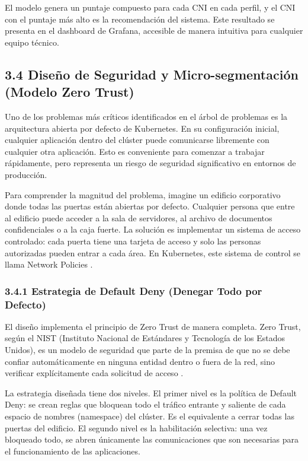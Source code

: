 \documentclass[journal]{IEEEtran}
\begin{document}
El modelo genera un puntaje compuesto para cada CNI en cada perfil, y el CNI con el puntaje más alto es la recomendación del sistema. Este resultado se presenta en el dashboard de Grafana, accesible de manera intuitiva para cualquier equipo técnico.

\subsection{3.4 Diseño de Seguridad y Micro-segmentación (Modelo Zero Trust)}

Uno de los problemas más críticos identificados en el árbol de problemas es la arquitectura abierta por defecto de Kubernetes. En su configuración inicial, cualquier aplicación dentro del clúster puede comunicarse libremente con cualquier otra aplicación. Esto es conveniente para comenzar a trabajar rápidamente, pero representa un riesgo de seguridad significativo en entornos de producción.

Para comprender la magnitud del problema, imagine un edificio corporativo donde todas las puertas están abiertas por defecto. Cualquier persona que entre al edificio puede acceder a la sala de servidores, al archivo de documentos confidenciales o a la caja fuerte. La solución es implementar un sistema de acceso controlado: cada puerta tiene una tarjeta de acceso y solo las personas autorizadas pueden entrar a cada área. En Kubernetes, este sistema de control se llama Network Policies \cite{ref24}.

\subsubsection{3.4.1 Estrategia de Default Deny (Denegar Todo por Defecto)}

El diseño implementa el principio de Zero Trust de manera completa. Zero Trust, según el NIST (Instituto Nacional de Estándares y Tecnología de los Estados Unidos), es un modelo de seguridad que parte de la premisa de que no se debe confiar automáticamente en ninguna entidad dentro o fuera de la red, sino verificar explícitamente cada solicitud de acceso \cite{ref24,ref25}.

La estrategia diseñada tiene dos niveles. El primer nivel es la política de Default Deny: se crean reglas que bloquean todo el tráfico entrante y saliente de cada espacio de nombres (namespace) del clúster. Es el equivalente a cerrar todas las puertas del edificio. El segundo nivel es la habilitación selectiva: una vez bloqueado todo, se abren únicamente las comunicaciones que son necesarias para el funcionamiento de las aplicaciones.
\end{document}
